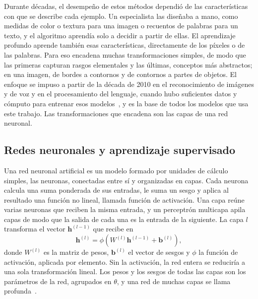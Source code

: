 Durante décadas, el desempeño de estos métodos dependió de las características con que se describe cada
ejemplo. Un especialista las diseñaba a mano, como medidas de color o textura para una imagen o recuentos de
palabras para un texto, y el algoritmo aprendía solo a decidir a partir de ellas. El aprendizaje profundo
aprende también esas características, directamente de los píxeles o de las palabras. Para eso encadena muchas
transformaciones simples, de modo que las primeras capturan rasgos elementales y las últimas, conceptos más
abstractos; en una imagen, de bordes a contornos y de contornos a partes de objetos. El enfoque se impuso a
partir de la década de 2010 en el reconocimiento de imágenes y de voz y en el procesamiento del lenguaje,
cuando hubo suficientes datos y cómputo para entrenar esos modelos~\cite{goodfellow2016deep}, y es la base de
todos los modelos que usa este trabajo. Las transformaciones que encadena son las capas de una red neuronal.

\subsection{Redes neuronales y aprendizaje supervisado}
\label{sec:marco_redes}

Una red neuronal artificial es un modelo formado por unidades de cálculo simples, las neuronas, conectadas
entre sí y organizadas en capas. Cada neurona calcula una suma ponderada de sus entradas, le suma un sesgo y
aplica al resultado una función no lineal, llamada función de activación. Una capa reúne varias neuronas que reciben la misma entrada,
y un perceptrón multicapa apila capas de modo que la salida de cada una es la entrada de la siguiente. La capa
$l$ transforma el vector $\mathbf{h}^{(l-1)}$ que recibe en
\begin{equation}
    \mathbf{h}^{(l)} = \phi\!\left(W^{(l)} \mathbf{h}^{(l-1)} + \mathbf{b}^{(l)}\right),
    \label{eq:marco_capa}
\end{equation}
donde $W^{(l)}$ es la matriz de pesos, $\mathbf{b}^{(l)}$ el vector de sesgos y $\phi$ la función de activación,
aplicada por elemento. Sin la activación, la red entera se reduciría a una sola transformación lineal. Los pesos
y los sesgos de todas las capas son los parámetros de la red, agrupados en $\theta$, y una red de muchas capas
se llama profunda~\cite{goodfellow2016deep}.

